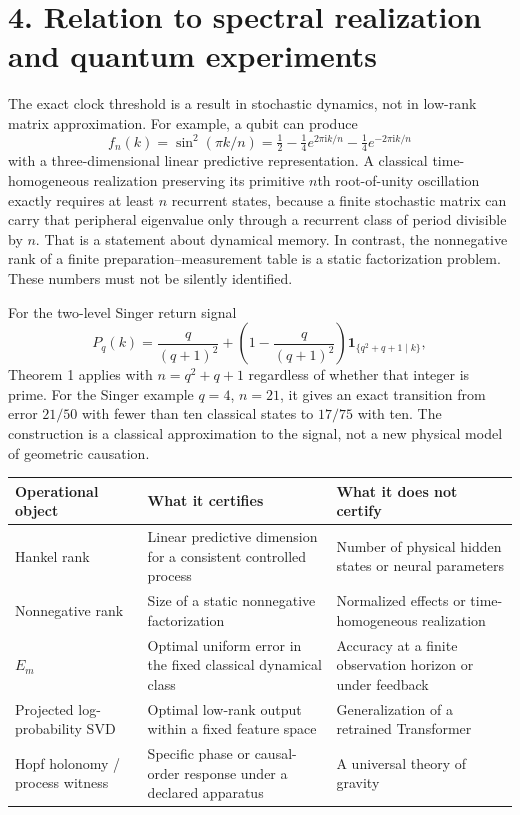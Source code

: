 \documentclass[11pt,a4paper,oneside]{book}
\newcommand{\one}{\mathbf 1}\newcommand{\ii}{\mathrm i}\newcommand{\dd}{\mathrm d}
\begin{document}
\section*{4. Relation to spectral realization and quantum experiments}
The exact clock threshold is a result in stochastic dynamics, not in low-rank matrix approximation. For example, a qubit can produce
\[f_n(k)=\sin^2(\pi k/n)=\tfrac12-\tfrac14e^{2\pi\ii k/n}-\tfrac14e^{-2\pi\ii k/n}\]
with a three-dimensional linear predictive representation. A classical time-homogeneous realization preserving its primitive $n$th root-of-unity oscillation exactly requires at least $n$ recurrent states, because a finite stochastic matrix can carry that peripheral eigenvalue only through a recurrent class of period divisible by $n$. That is a statement about dynamical memory. In contrast, the nonnegative rank of a finite preparation--measurement table is a static factorization problem. These numbers must not be silently identified.

For the two-level Singer return signal
\[P_q(k)=\frac{q}{(q+1)^2}+\left(1-\frac{q}{(q+1)^2}\right)\one_{\{q^2+q+1\mid k\}},\]
Theorem 1 applies with $n=q^2+q+1$ regardless of whether that integer is prime. For the Singer example $q=4$, $n=21$, it gives an exact transition from error $21/50$ with fewer than ten classical states to $17/75$ with ten. The construction is a classical approximation to the signal, not a new physical model of geometric causation.
\begin{center}\small\begin{tabularx}{\textwidth}{@{}p{}XX@{}}\toprule
Operational object&What it certifies&What it does not certify\\\midrule
Hankel rank&Linear predictive dimension for a consistent controlled process&Number of physical hidden states or neural parameters\\
Nonnegative rank&Size of a static nonnegative factorization&Normalized effects or time-homogeneous realization\\
$E_m$&Optimal uniform error in the fixed classical dynamical class&Accuracy at a finite observation horizon or under feedback\\
Projected log-probability SVD&Optimal low-rank output within a fixed feature space&Generalization of a retrained Transformer\\
Hopf holonomy / process witness&Specific phase or causal-order response under a declared apparatus&A universal theory of gravity\\\bottomrule
\end{tabularx}\end{center}
\end{document}
